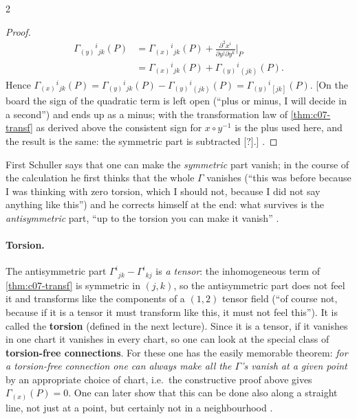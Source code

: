 \begin{paracol}{2}
\begin{proof}
\begin{align*}
  \Gamma_{(y)}{}^i{}_{jk}(P)&=\Gamma_{(x)}{}^i{}_{jk}(P)+\frac{\partial^2x^i}{\partial y^j\partial y^k}\Big|_P\\ &=\Gamma_{(x)}{}^i{}_{jk}(P)+\Gamma_{(y)}{}^i{}_{(jk)}(P).
\end{align*}
Hence $\Gamma_{(x)}{}^i{}_{jk}(P)=\Gamma_{(y)}{}^i{}_{jk}(P)-\Gamma_{(y)}{}^i{}_{(jk)}(P)=\Gamma_{(y)}{}^i{}_{[jk]}(P)$. [On the board the sign of the quadratic term is left open (``plus or minus, I will decide in a second'') and ends up as a minus; with the transformation law of \cref{thm:c07-transf} as derived above the consistent sign for $x\circ y^{-1}$ is the plus used here, and the result is the same: the symmetric part is subtracted [?].]
.
\end{proof}

\begin{coursenote}
First Schuller says that one can make the \emph{symmetric} part vanish; in the course of the calculation he first thinks that the whole $\Gamma$ vanishes (``this was before because I was thinking with zero torsion, which I should not, because I did not say anything like this'') and he corrects himself at the end: what survives is the \emph{antisymmetric} part, ``up to the torsion you can make it vanish''
.
\end{coursenote}

\paragraph{Torsion.} The antisymmetric part $\Gamma^i{}_{jk}-\Gamma^i{}_{kj}$ is \emph{a tensor}: the inhomogeneous term of \cref{thm:c07-transf} is symmetric in $(j,k)$, so the antisymmetric part does not feel it and transforms like the components of a $(1,2)$ tensor field (``of course not, because if it is a tensor it must transform like this, it must not feel this''). It is called the \textbf{torsion} (defined in the next lecture). Since it is a tensor, if it vanishes in one chart it vanishes in every chart, so one can look at the special class of \textbf{torsion-free connections}. For these one has the easily memorable theorem: \emph{for a torsion-free connection one can always make all the $\Gamma$'s vanish at a given point} by an appropriate choice of chart, i.e.\ the constructive proof above gives $\Gamma_{(x)}(P)=0$. One can later show that this can be done also along a straight line, not just at a point, but certainly not in a neighbourhood .


\end{paracol}

